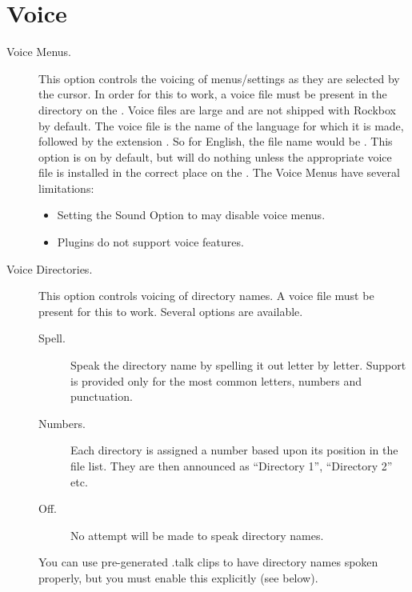 \section{\label{ref:Voiceconfiguration}Voice}

  \begin{description}
  \item[Voice Menus.]
    This option controls the voicing of menus/settings as they are selected
    by the cursor. In order for this to work, a voice file must be present 
    in the  directory on the \dap.  Voice files are large
    and are not  shipped with Rockbox by default.
    The voice file is the name of the language for which it is made, followed
    by the extension .  So for English, the file name would be 
    .
    This option is on by default, but will do nothing unless the 
    appropriate voice file is installed in the correct place on the \dap.
    The Voice Menus have several limitations:
    \begin{itemize}
    \item Setting the Sound Option  to  may 
      disable voice menus.
    \item Plugins  do not support
      voice features.
    \end{itemize}

  \item[Voice Directories.]
    This option controls voicing of directory names. A voice file must be present 
    for this to work. Several options are available.
    \begin{description}
    \item[Spell.]
      Speak the directory name by spelling it out letter by letter.  Support
      is provided only for the most common letters, numbers and punctuation.
    \item[Numbers.]
      Each directory is assigned a number based upon its position in the
      file list.  They are then announced as ``Directory 1'', ``Directory 2''
      etc.
    \item[Off.]
      No attempt will be made to speak directory names.
    \end{description}
    You can use pre-generated .talk clips to have  directory names spoken 
    properly, but you must enable this explicitly (see below).


\end{description}
